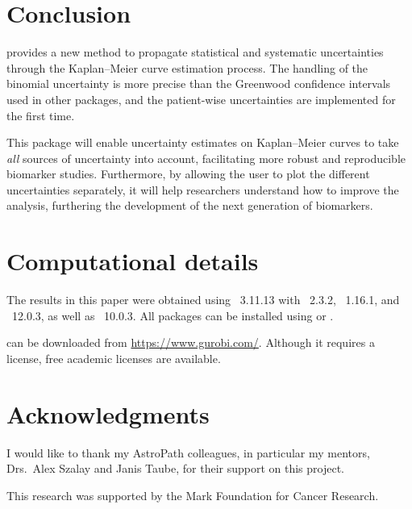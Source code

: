\documentclass[article]{jss}
\newcommand{\KM}{Kaplan--Meier} %
\begin{document}
\section{Conclusion}

 provides a new method to propagate statistical and systematic uncertainties through the \KM{} curve estimation process.  The handling of the binomial uncertainty is more precise than the Greenwood confidence intervals used in other packages, and the patient-wise uncertainties are implemented for the first time.

This package will enable uncertainty estimates on \KM{} curves to take \emph{all} sources of uncertainty into account, facilitating more robust and reproducible biomarker studies.  Furthermore, by allowing the user to plot the different uncertainties separately, it will help researchers understand how to improve the analysis, furthering the development of the next generation of biomarkers.

\section*{Computational details}

The results in this paper were obtained using ~3.11.13 with ~2.3.2, ~1.16.1, and ~12.0.3, as well as ~10.0.3.  All  packages can be installed using  or .

 can be downloaded from \url{https://www.gurobi.com/}.  Although it requires a license, free academic licenses are available.

\section*{Acknowledgments}

I would like to thank my AstroPath colleagues, in particular my mentors, Drs.~Alex Szalay and Janis Taube, for their support on this project.

This research was supported by the Mark Foundation for Cancer Research.

\end{document}

